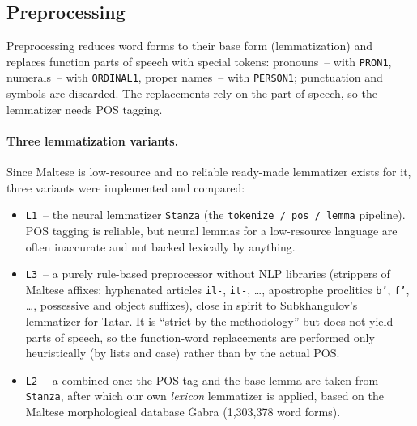 \documentclass[12pt,a4paper]{article}
\begin{document}
\subsection{Preprocessing}

Preprocessing reduces word forms to their base form (lemmatization) and replaces
function parts of speech with special tokens: pronouns~-- with \texttt{PRON1},
numerals~-- with \texttt{ORDINAL1}, proper names~-- with \texttt{PERSON1};
punctuation and symbols are discarded. The replacements rely on the part of
speech, so the lemmatizer needs POS tagging.

\paragraph{Three lemmatization variants.} Since Maltese is low-resource and no
reliable ready-made lemmatizer exists for it, three variants were implemented
and compared:
\begin{itemize}[nosep]
  \item \texttt{L1}~-- the neural lemmatizer \texttt{Stanza} (the
        \texttt{tokenize\,/\,pos\,/\,lemma} pipeline). POS tagging is reliable,
        but neural lemmas for a low-resource language are often inaccurate and
        not backed lexically by anything.
  \item \texttt{L3}~-- a purely rule-based preprocessor without NLP libraries
        (strippers of Maltese affixes: hyphenated articles \texttt{il-},
        \texttt{it-}, \ldots, apostrophe proclitics \texttt{b'},
        \texttt{f'}, \ldots, possessive and object suffixes), close in spirit
        to Subkhangulov's lemmatizer for Tatar. It is ``strict by the
        methodology'' but does not yield parts of speech, so the function-word
        replacements are performed only heuristically (by lists and case)
        rather than by the actual POS.
  \item \texttt{L2}~-- a combined one: the POS tag and the base lemma are taken
        from \texttt{Stanza}, after which our own \emph{lexicon} lemmatizer is
        applied, based on the Maltese morphological database Ġabra
        (1{,}303{,}378 word forms).
\end{itemize}
\end{document}
